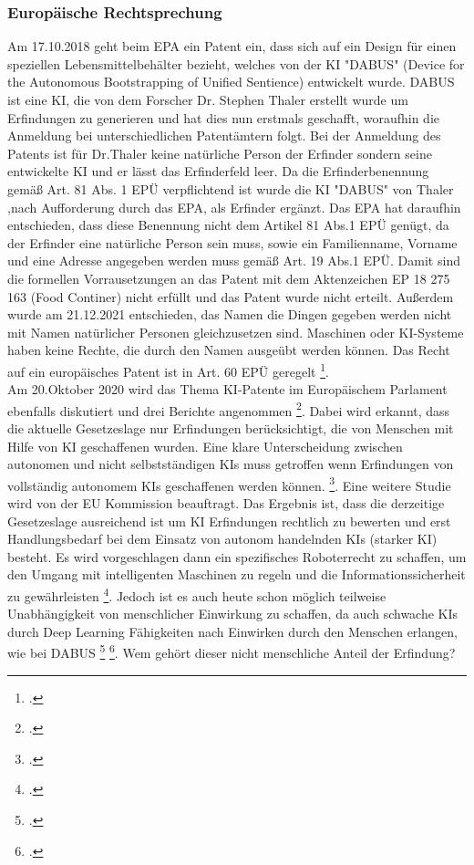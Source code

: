 \subsubsection{Europäische Rechtsprechung}
Am 17.10.2018 geht beim \gls{EPA} ein Patent ein, 
dass sich auf ein Design für einen speziellen Lebensmittelbehälter
bezieht,
welches von der KI "DABUS" (Device for the Autonomous Bootstrapping of Unified Sentience) 
entwickelt wurde. DABUS ist eine
KI, die von dem Forscher Dr. Stephen Thaler erstellt wurde
um Erfindungen zu generieren und hat dies nun erstmals geschafft,
woraufhin die Anmeldung bei unterschiedlichen Patentämtern folgt.
Bei der Anmeldung des Patents ist für Dr.Thaler 
keine natürliche Person der Erfinder
sondern seine entwickelte KI und er lässt das Erfinderfeld
leer. Da die Erfinderbenennung gemäß Art. 81 Abs. 1 EPÜ verpflichtend
ist wurde die KI 
"DABUS" von Thaler
,nach Aufforderung durch das EPA, 
als Erfinder ergänzt.
Das EPA hat daraufhin entschieden, 
dass diese Benennung nicht dem Artikel 81 Abs.1 \gls{EPÜ}  genügt,
da der Erfinder eine natürliche Person sein muss, sowie ein 
Familienname, Vorname und eine Adresse angegeben werden muss
gemäß Art. 19 Abs.1 EPÜ.
Damit sind die formellen Vorrausetzungen an das Patent mit dem Aktenzeichen
EP 18 275 163 (Food Continer) nicht erfüllt und das Patent wurde nicht erteilt. 
Außerdem wurde am 21.12.2021 entschieden, das Namen die Dingen gegeben werden nicht
mit Namen natürlicher Personen gleichzusetzen sind. Maschinen oder KI-Systeme 
haben keine Rechte, die durch den Namen ausgeübt werden können.
Das Recht auf ein europäisches Patent
ist in Art. 60 EPÜ geregelt \footcite{000820Designation}. 
\\
Am 20.Oktober 2020 wird das Thema KI-Patente im Europäischem
Parlament ebenfalls diskutiert und drei Berichte angenommen 
\footcite{KIRegelnWofuerEuropaeische2020}.
Dabei wird erkannt, 
dass die aktuelle Gesetzeslage nur Erfindungen berücksichtigt,
die von Menschen mit Hilfe von KI geschaffenen wurden. 
Eine klare Unterscheidung zwischen autonomen und
nicht selbstständigen KIs muss getroffen wenn Erfindungen 
von vollständig autonomem KIs geschaffenen werden können.
\footcite{TextsAdoptedIntellectual}.
Eine weitere Studie wird von der EU Kommission beauftragt. Das Ergebnis ist,
dass die derzeitige Gesetzeslage ausreichend ist um KI Erfindungen rechtlich
zu bewerten
und erst Handlungsbedarf bei dem Einsatz 
von autonom handelnden KIs (starker KI) besteht.
Es wird vorgeschlagen dann ein spezifisches Roboterrecht zu schaffen, 
um den Umgang mit intelligenten Maschinen zu regeln 
und die Informationssicherheit zu gewährleisten
\footcite{gutaAPPLICABILITYGDPRARTIFICIAL2022}.
Jedoch ist es auch heute schon möglich teilweise 
Unabhängigkeit von menschlicher Einwirkung
zu schaffen, da auch schwache KIs durch Deep Learning 
Fähigkeiten nach Einwirken durch den Menschen erlangen, wie bei DABUS
\footcite{surdenMachineLearningLaw} \footcite{dornisDornisSchopfungOhne2021}.
Wem gehört dieser nicht menschliche Anteil der Erfindung?




